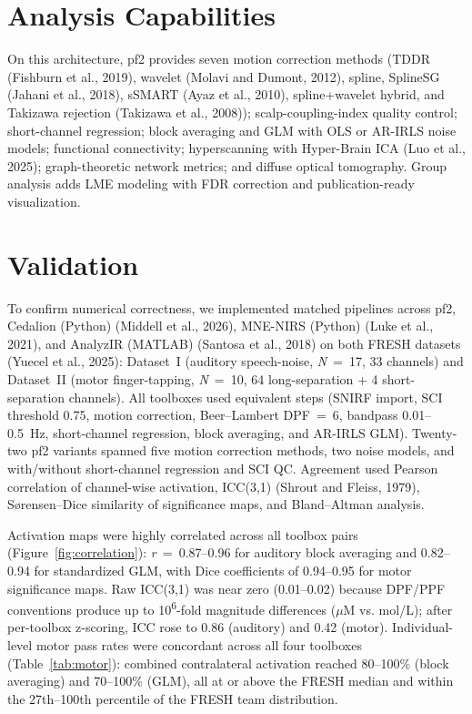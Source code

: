 \documentclass[11pt]{article}
\begin{document}
\section*{Analysis Capabilities}

On this architecture, pf2 provides seven motion correction methods (TDDR
(Fishburn et al., 2019), wavelet (Molavi and Dumont, 2012), spline, SplineSG
(Jahani et al., 2018), sSMART (Ayaz et al., 2010), spline+wavelet hybrid, and
Takizawa rejection (Takizawa et al., 2008)); scalp-coupling-index quality
control; short-channel regression; block averaging and GLM with OLS or AR-IRLS
noise models; functional connectivity; hyperscanning with Hyper-Brain ICA
(Luo et al., 2025); graph-theoretic network metrics; and diffuse optical
tomography. Group analysis adds LME modeling with FDR correction and
publication-ready visualization.

\section*{Validation}

To confirm numerical correctness, we implemented matched pipelines across pf2,
Cedalion (Python) (Middell et al., 2026), MNE-NIRS (Python) (Luke et al., 2021),
and AnalyzIR (MATLAB) (Santosa et al., 2018) on both FRESH datasets
(Yuecel et al., 2025): Dataset~I (auditory speech-noise, \textit{N}~=~17, 33
channels) and Dataset~II (motor finger-tapping, \textit{N}~=~10, 64
long-separation + 4 short-separation channels). All toolboxes used equivalent
steps (SNIRF import, SCI threshold 0.75, motion correction, Beer--Lambert
DPF~=~6, bandpass 0.01--0.5~Hz, short-channel regression, block averaging, and
AR-IRLS GLM). Twenty-two pf2 variants spanned five motion correction methods,
two noise models, and with/without short-channel regression and SCI QC.
Agreement used Pearson correlation of channel-wise activation, ICC(3,1)
(Shrout and Fleiss, 1979), S{\o}rensen--Dice similarity of significance maps,
and Bland--Altman analysis.

Activation maps were highly correlated across all toolbox pairs
(Figure~\ref{fig:correlation}): \textit{r}~=~0.87--0.96 for auditory block
averaging and 0.82--0.94 for standardized GLM, with Dice coefficients of
0.94--0.95 for motor significance maps. Raw ICC(3,1) was near zero (0.01--0.02)
because DPF/PPF conventions produce up to 10\textsuperscript{6}-fold magnitude
differences ($\mu$M vs. mol/L); after per-toolbox z-scoring, ICC rose to 0.86
(auditory) and 0.42 (motor). Individual-level motor pass rates were concordant
across all four toolboxes (Table~\ref{tab:motor}): combined contralateral
activation reached 80--100\% (block averaging) and 70--100\% (GLM), all at or
above the FRESH median and within the 27th--100th percentile of the FRESH team
distribution.
\end{document}
